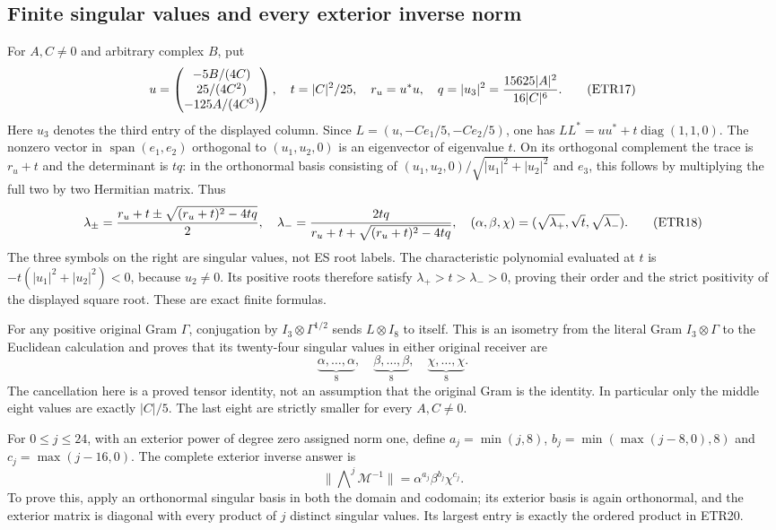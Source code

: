 \subsection{Finite singular values and every exterior inverse norm}
For $A,C\ne0$ and arbitrary complex $B$, put
\[
 u=\begin{pmatrix}-5B/(4C)\\25/(4C^2)\\-125A/(4C^3)\end{pmatrix},\quad
 t=|C|^2/25,\quad r_u=u^*u,\quad q=|u_3|^2
      ={15625|A|^2\over16|C|^6}.
                                                               \tag{ETR17}
\]
Here $u_3$ denotes the third entry of the displayed column. Since
$L=(u,-Ce_1/5,-Ce_2/5)$, one has
$LL^*=uu^*+t\operatorname{diag}(1,1,0)$. The nonzero vector in
$\operatorname{span}(e_1,e_2)$ orthogonal to $(u_1,u_2,0)$ is an
eigenvector of eigenvalue $t$. On its orthogonal complement the
trace is $r_u+t$ and the determinant is $tq$: in the orthonormal basis
consisting of $(u_1,u_2,0)/\sqrt{|u_1|^2+|u_2|^2}$ and $e_3$, this
follows by multiplying the full two by two Hermitian matrix. Thus
\[
 \lambda_\pm={r_u+t\pm\sqrt{(r_u+t)^2-4tq}\over2},\quad
 \lambda_-={2tq\over r_u+t+\sqrt{(r_u+t)^2-4tq}},\quad
 (\alpha,\beta,\chi)=(\sqrt{\lambda_+},\sqrt t,\sqrt{\lambda_-}).
                                                               \tag{ETR18}
\]
The three symbols on the right are singular values, not ES root labels.
The characteristic polynomial evaluated at $t$ is
$-t(|u_1|^2+|u_2|^2)<0$, because $u_2\ne0$. Its positive roots therefore
satisfy $\lambda_+>t>\lambda_->0$, proving their order and the strict
positivity of the displayed square root. These are exact finite formulas.

For any positive original Gram $\Gamma$, conjugation by
$I_3\otimes\Gamma^{1/2}$ sends $L\otimes I_8$ to itself. This is an
isometry from the literal Gram $I_3\otimes\Gamma$ to the Euclidean
calculation and proves that its twenty-four singular values in either
original receiver are
\[
 \underbrace{\alpha,\ldots,\alpha}_{8},\quad
 \underbrace{\beta,\ldots,\beta}_{8},\quad
 \underbrace{\chi,\ldots,\chi}_{8}.                     \tag{ETR19}
\]
The cancellation here is a proved tensor identity, not an assumption
that the original Gram is the identity. In particular only the middle
eight values are exactly $|C|/5$. The last eight are strictly smaller
for every $A,C\ne0$.

For $0\le j\le24$, with an exterior power of degree zero assigned
norm one, define $a_j=\min(j,8)$, $b_j=\min(\max(j-8,0),8)$ and
$c_j=\max(j-16,0)$. The complete exterior inverse answer is
\[
 \|\mathop{\bigwedge}\nolimits^j\mathcal M^{-1}\|
       =\alpha^{a_j}\beta^{b_j}\chi^{c_j}.               \tag{ETR20}
\]
To prove this, apply an orthonormal singular basis in both the domain
and codomain; its exterior basis is again orthonormal, and the exterior
matrix is diagonal with every product of $j$ distinct singular values.
Its largest entry is exactly the ordered product in ETR20.

